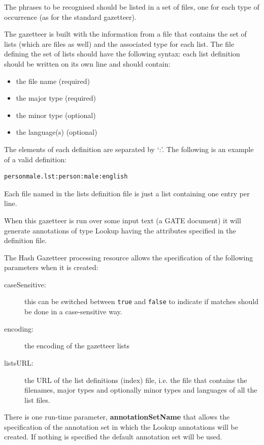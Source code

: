 
The phrases to be recognised should be listed in a set of files, one for
each type of occurrence (as for the standard gazetteer).

The gazetteer is built with the information from a file that contains the set
of lists (which are files as well) and the associated type for each list.
The file defining the set of lists should have the following syntax: each
list definition should be written on its own line and should contain:
\begin{itemize}
\item the file name (required)
\item the major type (required)
\item the minor type (optional)
\item the language(s) (optional)
\end{itemize}

The elements of each definition are separated by `:'. The following is an
example of a valid definition:
\begin{small}
\begin{verbatim}
personmale.lst:person:male:english
\end{verbatim}
\end{small}
Each file named in the lists definition file is just a list containing
one entry per line.

When this gazetteer is run over some input text (a GATE document) it
will generate annotations of type Lookup having the attributes specified in
the definition file.


The Hash Gazetteer processing resource allows the specification of the
following parameters when it is created:
\begin{description}
\item[caseSensitive:] this can be switched between \texttt{true} and 
\texttt{false} to indicate if matches should be done in a case-sensitive 
way.
\item[encoding:] the encoding of the gazetteer lists
\item[listsURL:] the URL of the list definitions (index) file, i.e. the
file that contains the filenames, major types and optionally minor types
and languages of all the list files.
\end{description}

There is one run-time parameter, \textbf{annotationSetName} that allows 
the specification of the annotation set in which the Lookup annotations
will be created. If nothing is specified the default annotation set
will be used.


